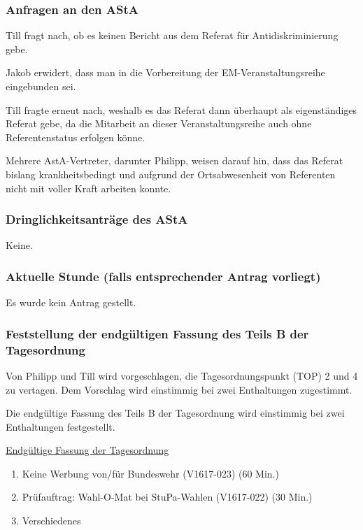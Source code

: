 \documentclass[ngerman,headheight=70pt]{scrartcl}
\begin{document}
    \subsubsection{Anfragen an den AStA}

    Till fragt nach, ob es keinen Bericht aus dem Referat für Antidiskriminierung gebe.

    Jakob erwidert, dass man in die Vorbereitung der EM-Veranstaltungsreihe
    eingebunden sei.

    Till fragte erneut nach, weshalb es das Referat dann überhaupt als eigenständiges
    Referat gebe, da die Mitarbeit an dieser Veranstaltungsreihe auch ohne
    Referentenstatus erfolgen könne.

    Mehrere AstA-Vertreter, darunter Philipp, weisen darauf hin, dass das Referat
    bislang krankheitsbedingt und aufgrund der Ortsabwesenheit von Referenten
    nicht mit voller Kraft arbeiten konnte.

    \subsubsection{Dringlichkeitsanträge des AStA}

    Keine.

    \subsubsection{Aktuelle Stunde (falls entsprechender Antrag vorliegt)}

    Es wurde kein Antrag gestellt.

    \subsubsection{Feststellung der endgültigen Fassung des Teils B der Tagesordnung}

    Von Philipp und Till wird vorgeschlagen, die Tagesordnungspunkt (TOP) 2 und
    4 zu vertagen. Dem Vorschlag wird einstimmig bei zwei Enthaltungen zugestimmt.

    Die endgültige Fassung des Teils B der Tagesordnung wird einstimmig bei zwei
    Enthaltungen festgestellt.

    \underline{Endgültige Fassung der Tagesordnung}
    \begin{enumerate}[label={\textbf{Top \theenumi}},leftmargin=*]
        \item Keine Werbung von/für Bundeswehr (V1617-023) (60 Min.)
        \item Prüfauftrag: Wahl-O-Mat bei StuPa-Wahlen (V1617-022) (30 Min.)
        \item Verschiedenes
    \end{enumerate}
\end{document}
